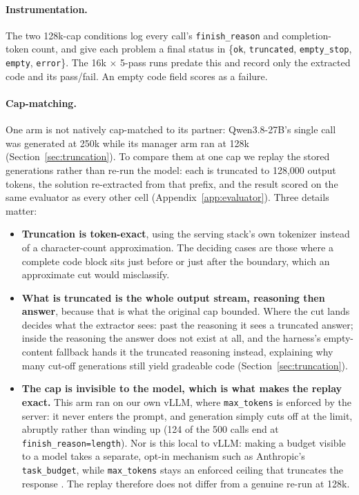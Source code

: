 \documentclass{article}
\begin{document}
\paragraph{Instrumentation.} The two 128k-cap conditions log every call's \texttt{finish\_reason}
and completion-token count, and give each problem a final status in \{\texttt{ok},
\texttt{truncated}, \texttt{empty\_stop}, \texttt{empty}, \texttt{error}\}. The 16k $\times$ 5-pass
runs predate this and record only the extracted code and its pass/fail. An empty code field scores
as a failure.

\paragraph{Cap-matching.} One arm is not natively cap-matched to its partner: Qwen3.8-27B's single
call was generated at 250k while its manager arm ran at 128k (Section~\ref{sec:truncation}). To
compare them at one cap we replay the stored generations rather than re-run the model: each is
truncated to 128,000 output tokens, the solution re-extracted from that prefix, and the result
scored on the same evaluator as every other cell (Appendix~\ref{app:evaluator}). Three details
matter:

\begin{itemize}
  \item \textbf{Truncation is token-exact}, using the serving stack's own tokenizer instead of a
  character-count approximation. The deciding cases are those where a complete code block sits just
  before or just after the boundary, which an approximate cut would misclassify.

  \item \textbf{What is truncated is the whole output stream, reasoning then answer}, because that
  is what the original cap bounded. Where the cut lands decides what the extractor sees: past the
  reasoning it sees a truncated answer; inside the reasoning the answer does not exist at all, and
  the harness's empty-content fallback hands it the truncated reasoning instead, explaining why
  many cut-off generations still yield gradeable code (Section~\ref{sec:truncation}).

  \item \textbf{The cap is invisible to the model, which is what makes the replay exact.} This arm
  ran on our own vLLM, where \texttt{max\_tokens} is enforced by the server: it never enters the
  prompt, and generation simply cuts off at the limit, abruptly rather than winding up (124 of the
  500 calls end at \texttt{finish\_reason=length}). Nor is this local to vLLM: making a
  budget visible to a model takes a separate, opt-in mechanism such as Anthropic's
  \texttt{task\_budget}, while \texttt{max\_tokens} stays an enforced ceiling that truncates the
  response \citep{anthropic2026effort}. The replay therefore does not differ from a genuine re-run
  at 128k.
\end{itemize}
\end{document}

